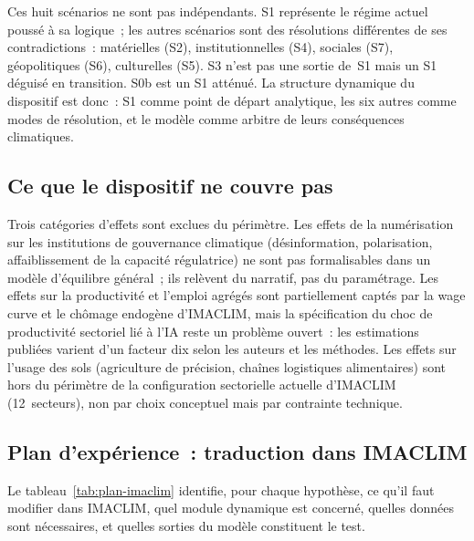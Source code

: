 \medskip

Ces huit sc\'enarios ne sont pas ind\'ependants. S1 repr\'esente le r\'egime actuel pouss\'e \`a sa logique~; les autres sc\'enarios sont des r\'esolutions diff\'erentes de ses contradictions~: mat\'erielles (S2), institutionnelles (S4), sociales (S7), g\'eopolitiques (S6), culturelles (S5). S3 n'est pas une sortie de~S1 mais un S1 d\'eguis\'e en transition. S0b est un S1 att\'enu\'e. La structure dynamique du dispositif est donc~: S1 comme point de d\'epart analytique, les six autres comme modes de r\'esolution, et le mod\`ele comme arbitre de leurs cons\'equences climatiques.


\subsection{Ce que le dispositif ne couvre pas}\label{sec:ch4-limites}

Trois catégories d'effets sont exclues du périmètre. Les effets de la numérisation sur les institutions de gouvernance climatique (désinformation, polarisation, affaiblissement de la capacité régulatrice) ne sont pas formalisables dans un modèle d'équilibre général~; ils relèvent du narratif, pas du paramétrage. Les effets sur la productivité et l'emploi agrégés sont partiellement captés par la wage curve et le chômage endogène d'IMACLIM, mais la spécification du choc de productivité sectoriel lié à l'IA reste un problème ouvert~: les estimations publiées varient d'un facteur dix selon les auteurs et les méthodes. Les effets sur l'usage des sols (agriculture de précision, chaînes logistiques alimentaires) sont hors du périmètre de la configuration sectorielle actuelle d'IMACLIM (12~secteurs), non par choix conceptuel mais par contrainte technique.


\subsection{Plan d'expérience~: traduction dans IMACLIM}\label{sec:ch4-plan}


Le tableau~\ref{tab:plan-imaclim} identifie, pour chaque hypothèse, ce qu'il faut modifier dans IMACLIM, quel module dynamique est concerné, quelles données sont nécessaires, et quelles sorties du modèle constituent le test.

